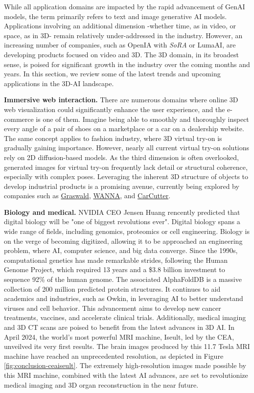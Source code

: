 While all application domains are impacted by the rapid advancement of \ac{GenAI} models, the term primarily refers to text and image generative \ac{AI} models. Applications involving an additional dimension -whether time, as in video, or space, as in 3D- remain relatively under-addressed in the industry. However, an increasing number of companies, such as OpenIA with \textit{SoRA} or LumaAI, are developing products focused on video and 3D. The 3D domain, in its broadest sense, is poised for significant growth in the industry over the coming months and years. In this section, we review some of the latest trends and upcoming applications in the 3D-\ac{AI} landscape. 

\noindent \textbf{Immersive web interaction.} There are numerous domains where online 3D web visualization could significantly enhance the user experience, and the e-commerce is one of them. Imagine being able to smoothly and thoroughly inspect every angle of a pair of shoes on a marketplace or a car on a dealership website. The same concept applies to fashion industry, where 3D virtual try-on is gradually gaining importance. However, nearly all current virtual try-on solutions rely on 2D diffusion-based models. As the third dimension is often overlooked, generated images for virtual try-on frequently lack detail or structural coherence, especially with complex poses. Leveraging the inherent 3D structure of objects to develop industrial products is a promising avenue, currently being explored by companies such as \href{https://www.graswald.ai/}{Graswald}, \href{https://wanna.fashion/}{WANNA}, and \href{https://www.car-cutter.com/}{CarCutter}. 

\noindent \textbf{Biology and medical.} NVIDIA CEO Jensen Huang rencently predicted that digital biology will be "one of biggest revolutions ever". Digital biology spans a wide range of fields, including genomics, proteomics or cell engineering. Biology is on the verge of becoming digitized, allowing it to be approached an engineering problem, where \ac{AI}, computer science, and big data converge. Since the 1990s, computational genetics has made remarkable strides, following the Human Genome Project, which required 13 years and a \$3.8 billion investment to sequence 92\% of the human genome. The associated AlphaFoldDB is a massive collection of 200 million predicted protein structures. It continues to aid academics and industries, such as Owkin, in leveraging \ac{AI} to better understand viruses and cell behavior. This advancement aims to develop new cancer treatments, vaccines, and accelerate clinical trials. Additionally, medical imaging and 3D CT scans are poised to benefit from the latest advances in 3D \ac{AI}. In April 2024, the world's most powerful MRI machine, Iseult, led by the CEA, unveilved its very first results. The brain images produced by this 11.7 Tesla MRI machine have reached an unprecedented resolution, as depicted in Figure \ref{fig:conclusion-ceaiseult}. The extremely high-resolution images made possible by this MRI machine, combined with the latest \ac{AI} advances, are set to revolutionize medical imaging and 3D organ reconstruction in the near future.

